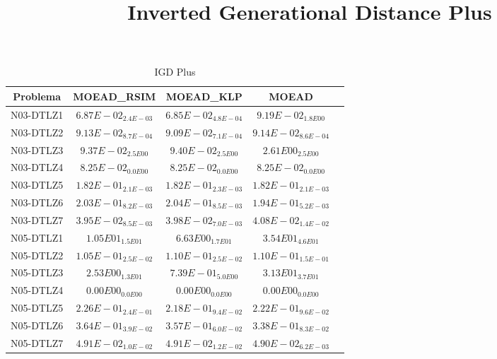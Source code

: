 \documentclass{article}
\title{Inverted Generational Distance Plus}
\author{}
\begin{document}
\maketitle
\begin{table*}[ht!]
\scriptsize
\caption{IGD Plus}
\centering\begin{tabular}{|c||c||c||c||c|} \hline
Problema &MOEAD_RSIM &MOEAD_KLP &MOEAD\\\hline
N03-DTLZ1 &\cellcolor{gray25}$6.87E-02_{2.4E-03}$ &\cellcolor{gray95}$6.85E-02_{4.8E-04}$ &$9.19E-02_{1.8E00}$\\ 
\hline
N03-DTLZ2 &\cellcolor{gray25}$9.13E-02_{8.7E-04}$ &\cellcolor{gray95}$9.09E-02_{7.1E-04}$ &$9.14E-02_{8.6E-04}$\\ 
\hline
N03-DTLZ3 &\cellcolor{gray95}$9.37E-02_{2.5E00}$ &\cellcolor{gray25}$9.40E-02_{2.5E00}$ &$2.61E00_{2.5E00}$\\ 
\hline
N03-DTLZ4 &\cellcolor{gray95}$8.25E-02_{0.0E00}$ &\cellcolor{gray25}$8.25E-02_{0.0E00}$ &$8.25E-02_{0.0E00}$\\ 
\hline
N03-DTLZ5 &\cellcolor{gray25}$1.82E-01_{2.1E-03}$ &\cellcolor{gray95}$1.82E-01_{2.3E-03}$ &$1.82E-01_{2.1E-03}$\\ 
\hline
N03-DTLZ6 &\cellcolor{gray25}$2.03E-01_{8.2E-03}$ &$2.04E-01_{8.5E-03}$ &\cellcolor{gray95}$1.94E-01_{5.2E-03}$\\ 
\hline
N03-DTLZ7 &\cellcolor{gray95}$3.95E-02_{8.5E-03}$ &\cellcolor{gray25}$3.98E-02_{7.0E-03}$ &$4.08E-02_{1.4E-02}$\\ 
\hline
N05-DTLZ1 &\cellcolor{gray25}$1.05E01_{1.5E01}$ &\cellcolor{gray95}$6.63E00_{1.7E01}$ &$3.54E01_{4.6E01}$\\ 
\hline
N05-DTLZ2 &\cellcolor{gray95}$1.05E-01_{2.5E-02}$ &\cellcolor{gray25}$1.10E-01_{2.5E-02}$ &$1.10E-01_{1.5E-01}$\\ 
\hline
N05-DTLZ3 &\cellcolor{gray25}$2.53E00_{1.3E01}$ &\cellcolor{gray95}$7.39E-01_{5.0E00}$ &$3.13E01_{3.7E01}$\\ 
\hline
N05-DTLZ4 &\cellcolor{gray95}$0.00E00_{0.0E00}$ &\cellcolor{gray25}$0.00E00_{0.0E00}$ &$0.00E00_{0.0E00}$\\ 
\hline
N05-DTLZ5 &$2.26E-01_{2.4E-01}$ &\cellcolor{gray95}$2.18E-01_{9.4E-02}$ &\cellcolor{gray25}$2.22E-01_{9.6E-02}$\\ 
\hline
N05-DTLZ6 &$3.64E-01_{3.9E-02}$ &\cellcolor{gray25}$3.57E-01_{6.0E-02}$ &\cellcolor{gray95}$3.38E-01_{8.3E-02}$\\ 
\hline
N05-DTLZ7 &$4.91E-02_{1.0E-02}$ &\cellcolor{gray25}$4.91E-02_{1.2E-02}$ &\cellcolor{gray95}$4.90E-02_{6.2E-03}$\\ 

\end{tabular}
\end{table*}
\end{document}
